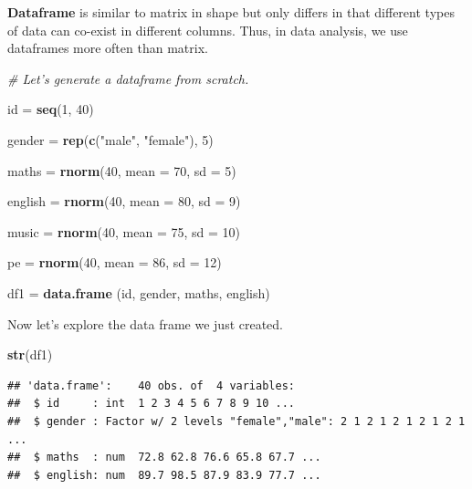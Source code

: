 \documentclass[]{book}
\newenvironment{Shaded}{\begin{snugshade}}{\end{snugshade}}
\newcommand{\KeywordTok}[1]{\textcolor[rgb]{0.13,0.29,0.53}{\textbf{#1}}}
\newcommand{\DataTypeTok}[1]{\textcolor[rgb]{0.13,0.29,0.53}{#1}}
\newcommand{\DecValTok}[1]{\textcolor[rgb]{0.00,0.00,0.81}{#1}}
\newcommand{\StringTok}[1]{\textcolor[rgb]{0.31,0.60,0.02}{#1}}
\newcommand{\CommentTok}[1]{\textcolor[rgb]{0.56,0.35,0.01}{\textit{#1}}}
\newcommand{\NormalTok}[1]{#1}
\begin{document}
\textbf{Dataframe} is similar to matrix in shape but only differs in
that different types of data can co-exist in different columns. Thus, in
data analysis, we use dataframes more often than matrix.

\begin{Shaded}
\begin{Highlighting}[]
\CommentTok{# Let's generate a dataframe from scratch.}

\NormalTok{id =}\StringTok{ }\KeywordTok{seq}\NormalTok{(}\DecValTok{1}\NormalTok{, }\DecValTok{40}\NormalTok{)}

\NormalTok{gender =}\StringTok{ }\KeywordTok{rep}\NormalTok{(}\KeywordTok{c}\NormalTok{(}\StringTok{"male"}\NormalTok{, }\StringTok{"female"}\NormalTok{), }\DecValTok{5}\NormalTok{)}

\NormalTok{maths =}\StringTok{ }\KeywordTok{rnorm}\NormalTok{(}\DecValTok{40}\NormalTok{, }\DataTypeTok{mean =} \DecValTok{70}\NormalTok{, }\DataTypeTok{sd =} \DecValTok{5}\NormalTok{)}

\NormalTok{english =}\StringTok{ }\KeywordTok{rnorm}\NormalTok{(}\DecValTok{40}\NormalTok{, }\DataTypeTok{mean =} \DecValTok{80}\NormalTok{, }\DataTypeTok{sd =} \DecValTok{9}\NormalTok{)}

\NormalTok{music =}\StringTok{ }\KeywordTok{rnorm}\NormalTok{(}\DecValTok{40}\NormalTok{, }\DataTypeTok{mean =} \DecValTok{75}\NormalTok{, }\DataTypeTok{sd =} \DecValTok{10}\NormalTok{)}

\NormalTok{pe =}\StringTok{ }\KeywordTok{rnorm}\NormalTok{(}\DecValTok{40}\NormalTok{, }\DataTypeTok{mean =} \DecValTok{86}\NormalTok{, }\DataTypeTok{sd =} \DecValTok{12}\NormalTok{)}

\NormalTok{df1 =}\StringTok{ }\KeywordTok{data.frame}\NormalTok{ (id, gender, maths, english)}
\end{Highlighting}
\end{Shaded}

Now let's explore the data frame we just created.

\begin{Shaded}
\begin{Highlighting}[]
\KeywordTok{str}\NormalTok{(df1)}
\end{Highlighting}
\end{Shaded}

\begin{verbatim}
## 'data.frame':    40 obs. of  4 variables:
##  $ id     : int  1 2 3 4 5 6 7 8 9 10 ...
##  $ gender : Factor w/ 2 levels "female","male": 2 1 2 1 2 1 2 1 2 1 ...
##  $ maths  : num  72.8 62.8 76.6 65.8 67.7 ...
##  $ english: num  89.7 98.5 87.9 83.9 77.7 ...
\end{verbatim}
\end{document}
